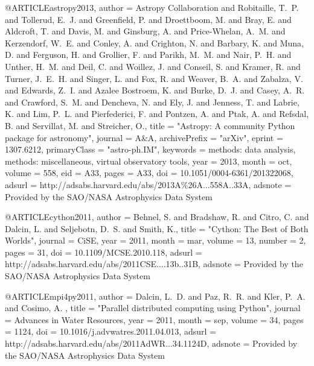 @ARTICLE{astropy2013,
   author = {{Astropy Collaboration} and {Robitaille}, T.~P. and {Tollerud}, E.~J. and
	{Greenfield}, P. and {Droettboom}, M. and {Bray}, E. and {Aldcroft}, T. and
	{Davis}, M. and {Ginsburg}, A. and {Price-Whelan}, A.~M. and
	{Kerzendorf}, W.~E. and {Conley}, A. and {Crighton}, N. and
	{Barbary}, K. and {Muna}, D. and {Ferguson}, H. and {Grollier}, F. and
	{Parikh}, M.~M. and {Nair}, P.~H. and {Unther}, H.~M. and {Deil}, C. and
	{Woillez}, J. and {Conseil}, S. and {Kramer}, R. and {Turner}, J.~E.~H. and
	{Singer}, L. and {Fox}, R. and {Weaver}, B.~A. and {Zabalza}, V. and
	{Edwards}, Z.~I. and {Azalee Bostroem}, K. and {Burke}, D.~J. and
	{Casey}, A.~R. and {Crawford}, S.~M. and {Dencheva}, N. and
	{Ely}, J. and {Jenness}, T. and {Labrie}, K. and {Lim}, P.~L. and
	{Pierfederici}, F. and {Pontzen}, A. and {Ptak}, A. and {Refsdal}, B. and
	{Servillat}, M. and {Streicher}, O.},
    title = "{Astropy: A community Python package for astronomy}",
  journal = {A\&A},
archivePrefix = "arXiv",
   eprint = {1307.6212},
 primaryClass = "astro-ph.IM",
 keywords = {methods: data analysis, methods: miscellaneous, virtual observatory tools},
     year = 2013,
    month = oct,
   volume = 558,
      eid = {A33},
    pages = {A33},
      doi = {10.1051/0004-6361/201322068},
   adsurl = {http://adsabs.harvard.edu/abs/2013A\%26A...558A..33A},
  adsnote = {Provided by the SAO/NASA Astrophysics Data System}
}





@ARTICLE{cython2011,
   author = {{Behnel}, S. and {Bradshaw}, R. and {Citro}, C. and {Dalcin}, L. and
	{Seljebotn}, D.~S. and {Smith}, K.},
    title = "{Cython: The Best of Both Worlds}",
  journal = {CiSE},
     year = 2011,
    month = mar,
   volume = 13,
   number = 2,
    pages = {31},
      doi = {10.1109/MCSE.2010.118},
   adsurl = {http://adsabs.harvard.edu/abs/2011CSE....13b..31B},
  adsnote = {Provided by the SAO/NASA Astrophysics Data System}
}





@ARTICLE{mpi4py2011,
   author = {{Dalcin}, L.~D. and {Paz}, R.~R. and {Kler}, P.~A. and {Cosimo}, A.
	},
    title = "{Parallel distributed computing using Python}",
  journal = {Advances in Water Resources},
     year = 2011,
    month = sep,
   volume = 34,
    pages = {1124},
      doi = {10.1016/j.advwatres.2011.04.013},
   adsurl = {http://adsabs.harvard.edu/abs/2011AdWR...34.1124D},
  adsnote = {Provided by the SAO/NASA Astrophysics Data System}
}





